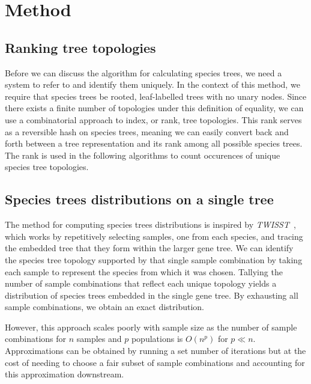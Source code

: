 \documentclass{article}
\newcommand{\twisst}{{\textit{TWISST}}}
\begin{document}
\section{Method}
\subsection{Ranking tree topologies}

Before we can discuss the algorithm for calculating species trees, we
need a system to refer to and identify them uniquely.
In the context of this method, we require that species trees be rooted,
leaf-labelled trees with no unary nodes.
Since there exists a finite number of topologies under this definition
of equality, we can use a combinatorial approach to index, or rank,
tree topologies.
This rank serves as a reversible hash on species trees, meaning we can
easily convert back and forth between a tree representation and its
rank among all possible species trees. The rank is used in the following
algorithms to count occurences of unique species tree topologies.

\subsection{Species trees distributions on a single tree}

The method for computing species trees distributions is inspired by
\twisst{}~\citep{Martin429}, which works
by repetitively selecting samples, one from each species, and tracing the
embedded tree that they form within the larger gene tree.
We can identify the species tree topology supported by that single sample
combination by taking each sample to represent the species from which it
was chosen.
Tallying the number of sample combinations that
reflect each unique topology yields a distribution of species trees
embedded in the single gene tree. By exhausting all sample combinations,
we obtain an exact distribution.

However, this approach scales poorly with sample size as the number
of sample combinations for $n$ samples and $p$ populations is $O(n^p)$ for
$p \ll n$. Approximations can be obtained by running a set number of iterations
but at the cost of needing to choose a fair subset of sample combinations and
accounting for this approximation downstream.
\end{document}
